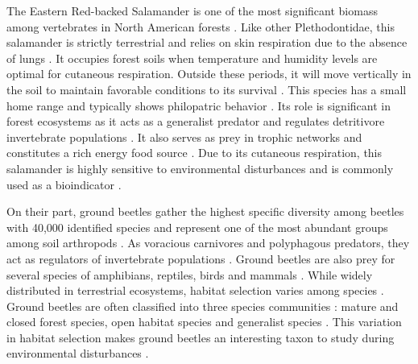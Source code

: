 The Eastern Red-backed Salamander is one of the most significant biomass among vertebrates in North American forests \citep{Burton1975Salamanderpopulations,Petranka1993Effectstimber,semlitschAbundanceBiomassProduction2014a}. 
Like other Plethodontidae, this salamander is strictly terrestrial and relies on skin respiration due to the absence of lungs \citep{Heatwole1961Relationsubstrate}. 
It occupies forest soils when temperature and humidity levels are optimal for cutaneous respiration. 
Outside these periods, it will move vertically in the soil to maintain favorable conditions to its survival \citep{Grizzell1949HibernationSite}. 
This species has a small home range and typically shows philopatric behavior \citep{Yurewicz2004ResourceAvailability}. 
Its role is significant in forest ecosystems as it acts as a generalist predator and regulates detritivore invertebrate populations \citep{Burton1975Energyflow,Hickerson2017Easternredbacked,Walton2013Topdownregulation}. 
It also serves as prey in trophic networks and constitutes a rich energy food source \citep{Burton1975Energyflow,Pough1987abundancesalamanders}. 
Due to its cutaneous respiration, this salamander is highly sensitive to environmental disturbances \citep{Welsh2001caseusing} and is commonly used as a bioindicator \citep{Baecher2018Environmentalgradients,gibbsDistributionWoodlandAmphibians1998,Heatwole1962EnvironmentalFactors,Harpole1999Effectsseven,Hocking2013Effectsexperimental,Mazerolle2021Woodlandsalamander}.

On their part, ground beetles gather the highest specific diversity among beetles with 40,000 identified species and represent one of the most abundant groups among soil arthropods \citep{Erwin1985taxonpulse,loveiEcologyBehaviorGround1996,Rochefort2006GroundBeetle}. 
As voracious carnivores and polyphagous predators, they act as regulators of invertebrate populations \citep{loveiEcologyBehaviorGround1996}. 
Ground beetles are also prey for several species of amphibians, reptiles, birds and mammals \citep{loveiEcologyBehaviorGround1996}. 
While widely distributed in terrestrial ecosystems, habitat selection varies among species \citep{Larochelle2003naturalhistory}. 
Ground beetles are often classified into three species communities : mature and closed forest species, open habitat species and generalist species \citep{Niemela2007effectsforestry}. 
This variation in habitat selection makes ground beetles an interesting taxon to study during environmental disturbances \citep{bouchardBeetleCommunityResponse2016b,Halme1993Carabidbeetles,Heliola2001Distributioncarabid,koivulaBorealCarabidbeetleColeoptera2002a,Luff1992Classificationprediction,Niemela2001Carabidbeetles,Rainio2003Groundbeetles,Work2008Evaluationcarabid}.

